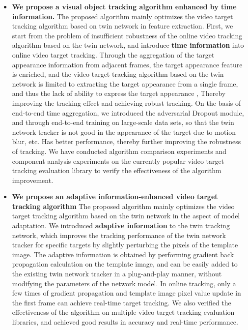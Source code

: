 \begin{itemize}
\item{\textbf{We propose a visual object tracking algorithm enhanced by time information.} The proposed algorithm mainly optimizes the video target tracking algorithm based on twin network in feature extraction. First, we start from the problem of insufficient robustness of the online video tracking algorithm based on the twin network, and introduce \textbf{time information} into online video target tracking. Through the aggregation of the target appearance information from adjacent frames, the target appearance feature is enriched, and the video target tracking algorithm based on the twin network is limited to extracting the target appearance from a single frame, and thus the lack of ability to express the target appearance , Thereby improving the tracking effect and achieving robust tracking. On the basis of end-to-end time aggregation, we introduced the adversarial Dropout module, and through end-to-end training on large-scale data sets, so that the twin network tracker is not good in the appearance of the target due to motion blur, etc. Has better performance, thereby further improving the robustness of tracking. We have conducted algorithm comparison experiments and component analysis experiments on the currently popular video target tracking evaluation library to verify the effectiveness of the algorithm improvement.}

\item{\textbf{We propose an adaptive information-enhanced video target tracking algorithm} The proposed algorithm mainly optimizes the video target tracking algorithm based on the twin network in the aspect of model adaptation. We introduced \textbf{adaptive information} to the twin tracking network, which improves the tracking performance of the twin network tracker for specific targets by slightly perturbing the pixels of the template image. The adaptive information is obtained by performing gradient back propagation calculation on the template image, and can be easily added to the existing twin network tracker in a plug-and-play manner, without modifying the parameters of the network model. In online tracking, only a few times of gradient propagation and template image pixel value update in the first frame can achieve real-time target tracking. We also verified the effectiveness of the algorithm on multiple video target tracking evaluation libraries, and achieved good results in accuracy and real-time performance.}


\end{itemize}

